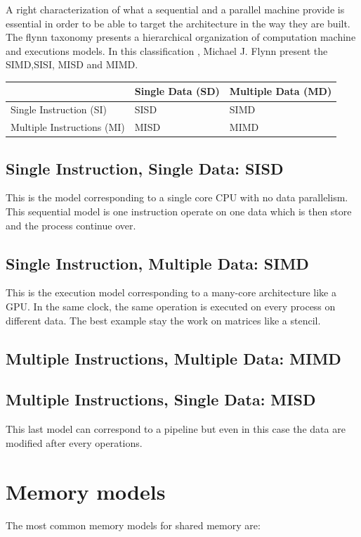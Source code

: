 A right characterization of what a sequential and a parallel machine provide is essential in order to be able to target the architecture in the way they are built.
The flynn taxonomy presents a hierarchical organization of computation machine and executions models.
In this classification \cite{flynn1972some}, Michael J. Flynn present the SIMD,SISI, MISD and MIMD.

\begin{center}
\begin{tabular}{| l | l | l |}
						& Single Data (SD) 	& Multiple Data (MD) \\
\hline
Single Instruction (SI)		&  SISD			& SIMD \\
\hline
Multiple Instructions (MI) 	& 	MISD		& MIMD \\
\hline
\end{tabular}
\end{center}

\subsection{Single Instruction, Single Data: SISD}
This is the model corresponding to a single core CPU with no data parallelism. 
This sequential model is one instruction operate on one data which is then store and the process continue over. 

\subsection{Single Instruction, Multiple Data: SIMD}
This is the execution model corresponding to a many-core architecture like a GPU. 
In the same clock, the same operation is executed on every process on different data. 
The best example stay the work on matrices like a stencil. 

\subsection{Multiple Instructions, Multiple Data: MIMD}

\subsection{Multiple Instructions, Single Data: MISD}
This last model can correspond to a pipeline but even in this case the data are modified after every operations. 

\section{Memory models}
The most common memory models for shared memory are: 
